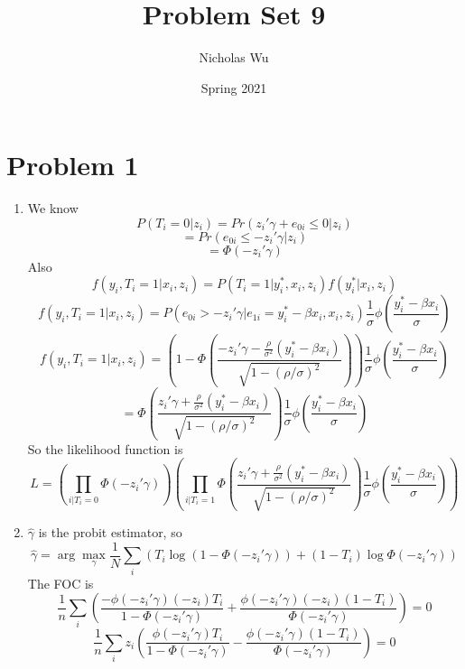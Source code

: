 \documentclass[10pt,letter]{article}
\begin{document}


\title{Problem Set 9}

\author{Nicholas Wu}

\date{Spring 2021}

\maketitle


\section*{Problem 1}
\begin{enumerate}[label=(\alph*)]
\item We know
\[ P(T_i = 0 | z_i ) = Pr(z_i'\gamma + e_{0i} \le 0 | z_i ) \]
 \[ = Pr(e_{0i} \le -z_i'\gamma  | z_i ) \]
 \[ = \Phi(-z_i'\gamma)\]
 Also
 \[ f(y_i, T_i = 1 | x_i, z_i) = P(T_i = 1 | y^*_i, x_i, z_i) f(y^*_i|x_i,z_i) \]
 \[ f(y_i, T_i = 1 | x_i, z_i) = P(e_{0i} > -z_i'\gamma | e_{1i} = y^*_i - \beta x_i, x_i, z_i) \frac{1}{\sigma}\phi\left(\frac{y^*_i - \beta x_i}{\sigma}\right) \]
 \[ f(y_i, T_i = 1 | x_i, z_i) =\left(1 - \Phi \left( \frac{-z_i'\gamma - \frac{\rho}{\sigma^2}(y^*_i - \beta x_i)}{\sqrt{1 - (\rho/\sigma)^2}} \right) \right) \frac{1}{\sigma}\phi\left(\frac{y^*_i - \beta x_i}{\sigma}\right) \]
 \[ = \Phi \left( \frac{z_i'\gamma + \frac{\rho}{\sigma^2}(y^*_i - \beta x_i)}{\sqrt{1 - (\rho/\sigma)^2}}  \right) \frac{1}{\sigma}\phi\left(\frac{y^*_i - \beta x_i}{\sigma}\right) \]
 So the likelihood function is
 \[ L =\left( \prod_{i | T_i = 0} \Phi(-z_i'\gamma) \right) \left( \prod_{i | T_i = 1}\Phi \left( \frac{z_i'\gamma + \frac{\rho}{\sigma^2}(y^*_i - \beta x_i)}{\sqrt{1 - (\rho/\sigma)^2}}  \right) \frac{1}{\sigma}\phi\left(\frac{y^*_i - \beta x_i}{\sigma}\right)  \right) \]
\item $\hat{\gamma}$ is the probit estimator, so
\[ \hat{\gamma} = \arg \max_\gamma \frac{1}{N} \sum_i \left(T_i \log(1 - \Phi(-z_i'\gamma)) + (1-T_i)\log \Phi(-z_i'\gamma) \right) \]
The FOC is
\[ \frac{1}{n}\sum_i \left(\frac{-\phi(-z_i'\gamma)(-z_i) T_i}{1 - \Phi(-z_i'\gamma)} + \frac{\phi(-z_i'\gamma)(-z_i)(1-T_i)}{\Phi(-z_i'\gamma)}\right) = 0 \]
\[ \frac{1}{n}\sum_i z_i\left(\frac{\phi(-z_i'\gamma) T_i}{1 - \Phi(-z_i'\gamma)} - \frac{\phi(-z_i'\gamma)(1-T_i)}{\Phi(-z_i'\gamma)}\right) = 0 \]

\end{enumerate}
\end{document}
